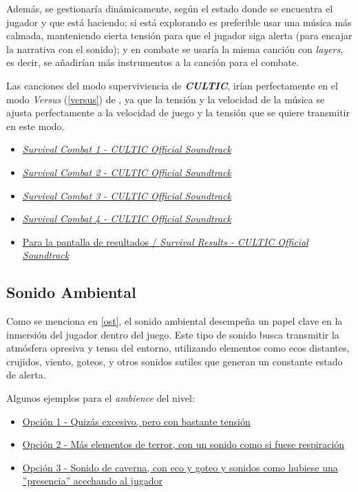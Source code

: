         Además, se gestionaría dinámicamente, según el estado donde se encuentra el jugador y que está haciendo; si está explorando es preferible usar una música más calmada, manteniendo cierta tensión para que el jugador siga alerta (para encajar la narrativa con el sonido); y en combate se usaría la misma canción con \textit{layers}, es decir, se añadirían más instrumentos a la canción para el combate.

        Las canciones del modo superviviencia de \textit{\textbf{CULTIC}}, irían perfectamente en el modo \textit{Versus} (\ref{versus}) de \TWD, ya que la tensión y la velocidad de la música se ajusta perfectamente a la velocidad de juego y la tensión que se quiere transmitir en este modo.
        \begin{itemize}
            \item \href{https://www.youtube.com/watch?v=LXxBT9cmWjI&t=3835s}{\textit{Survival Combat 1 - CULTIC Official Soundtrack}}
            \item \href{https://www.youtube.com/watch?v=LXxBT9cmWjI&t=3931s}{\textit{Survival Combat 2 - CULTIC Official Soundtrack}}
            \item \href{https://www.youtube.com/watch?v=LXxBT9cmWjI&t=4075s}{\textit{Survival Combat 3 - CULTIC Official Soundtrack}}
            \item \href{https://www.youtube.com/watch?v=LXxBT9cmWjI&t=4219s}{\textit{Survival Combat 4 - CULTIC Official Soundtrack}}
            \item \href{https://www.youtube.com/watch?v=LXxBT9cmWjI&t=4315s}{Para la pantalla de resultados / \textit{Survival Results - CULTIC Official Soundtrack}}
        \end{itemize}
    \subsection{Sonido Ambiental}
    Como se menciona en \ref{ost}, el sonido ambiental desempeña un papel clave en la inmersión del jugador dentro del juego. Este tipo de sonido busca transmitir la atmósfera opresiva y tensa del entorno, utilizando elementos como ecos distantes, crujidos, viento, goteos, y otros sonidos sutiles que generan un constante estado de alerta.

    Algunos ejemplos para el \textit{ambience} del nivel:
    \begin{itemize}
        \item \href{https://drive.google.com/open?id=1-BAV8BI2FhwryOpE2sznbGjXXjKJc67C&usp=drive_fs}{Opción 1 - Quizás excesivo, pero con bastante tensión}
        \item \href{https://drive.google.com/open?id=1-IY4kPhNsTwj1qDsUoW82h4YJGS7cgLj&usp=drive_fs}{Opción 2 - Más elementos de terror, con un sonido como si fuese respiración}
        \item \href{https://drive.google.com/open?id=1-MlHY4gsA-Nj3UdmaBdFvPJ8E1NEC-u2&usp=drive_fs}{Opción 3 - Sonido de caverna, con eco y goteo y sonidos como hubiese una ''presencia'' acechando al jugador}
    \end{itemize}

